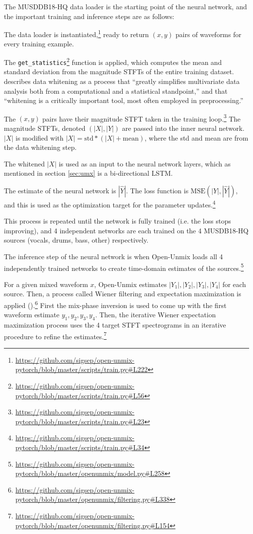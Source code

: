 \documentclass[report.tex]{subfiles}
\begin{document}
The MUSDDB18-HQ data loader is the starting point of the neural network, and the important training and inference steps are as follows:

\begin{tight_enumerate}
	\item
		The data loader is instantiated,\footnote{\url{https://github.com/sigsep/open-unmix-pytorch/blob/master/scripts/train.py\#L222}} ready to return $(x, y)$ pairs of waveforms for every training example.
	\item
		The \Verb#get_statistics#\footnote{\url{https://github.com/sigsep/open-unmix-pytorch/blob/master/scripts/train.py\#L56}} function is applied, which computes the mean and standard deviation from the magnitude STFTs of the entire training dataset. \textcite[309]{Kessy_2018} describes data whitening as a process that ``greatly simplifies multivariate data analysis both from a computational and a statistical standpoint,'' and that ``whitening is a critically important tool, most often employed in preprocessing.''
	\item
		The $(x, y)$ pairs have their magnitude STFT taken in the training loop.\footnote{\url{https://github.com/sigsep/open-unmix-pytorch/blob/master/scripts/train.py\#L23}} The magnitude STFTs, denoted $(|X|, |Y|)$ are passed into the inner neural network. $|X|$ is modified with $|X| = \text{std}*(|X|+\text{mean})$, where the std and mean are from the data whitening step.
	\item
		The whitened $|X|$ is used as an input to the neural network layers, which as mentioned in section \ref{sec:umx} is a bi-directional LSTM.
	\item
		The estimate of the neural network is $|\hat{Y}|$. The loss function is $\text{MSE}(|Y|, |\hat{Y}|)$, and this is used as the optimization target for the parameter updates.\footnote{\url{https://github.com/sigsep/open-unmix-pytorch/blob/master/scripts/train.py\#L34}}
	\item
		This process is repeated until the network is fully trained (i.e. the loss stops improving), and 4 independent networks are each trained on the 4 MUSDB18-HQ sources (vocals, drums, bass, other) respectively.
	\item
		The inference step of the neural network is when Open-Unmix loads all 4 independently trained networks to create time-domain estimates of the sources.\footnote{\url{https://github.com/sigsep/open-unmix-pytorch/blob/master/openunmix/model.py\#L258}}
	\item
		For a given mixed waveform $x$, Open-Unmix estimates $|Y_{1}|, |Y_{2}|, |Y_{3}|, |Y_{4}|$ for each source. Then, a process called Wiener filtering and expectation maximization is applied (\cite{umxorig1, wiener2, wiener3, wiener4}).\footnote{\url{https://github.com/sigsep/open-unmix-pytorch/blob/master/openunmix/filtering.py\#L338}} First the mix-phase inversion is used to come up with the first waveform estimate $y_{1}, y_{2}, y_{3}, y_{4}$. Then, the iterative Wiener expectation maximization process uses the 4 target STFT spectrograms in an iterative procedure to refine the estimates.\footnote{\url{https://github.com/sigsep/open-unmix-pytorch/blob/master/openunmix/filtering.py\#L154}}
\end{tight_enumerate}
\end{document}
